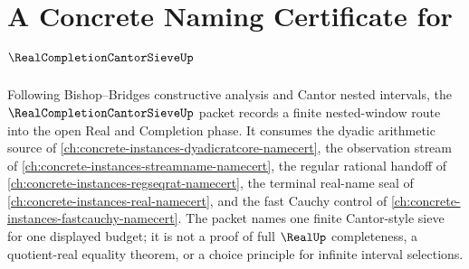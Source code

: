 \chapter{A Concrete Naming Certificate for $\RealCompletionCantorSieveUp$}
\label{ch:concrete-instances-real-completion-cantor-sieve-namecert}

Following Bishop--Bridges constructive analysis and Cantor nested intervals, the $\RealCompletionCantorSieveUp$ packet records a finite nested-window route into the open Real and Completion phase. It consumes the dyadic arithmetic source of \autoref{ch:concrete-instances-dyadicratcore-namecert}, the observation stream of \autoref{ch:concrete-instances-streamname-namecert}, the regular rational handoff of \autoref{ch:concrete-instances-regseqrat-namecert}, the terminal real-name seal of \autoref{ch:concrete-instances-real-namecert}, and the fast Cauchy control of \autoref{ch:concrete-instances-fastcauchy-namecert}. The packet names one finite Cantor-style sieve for one displayed budget; it is not a proof of full $\RealUp$ completeness, a quotient-real equality theorem, or a choice principle for infinite interval selections.

